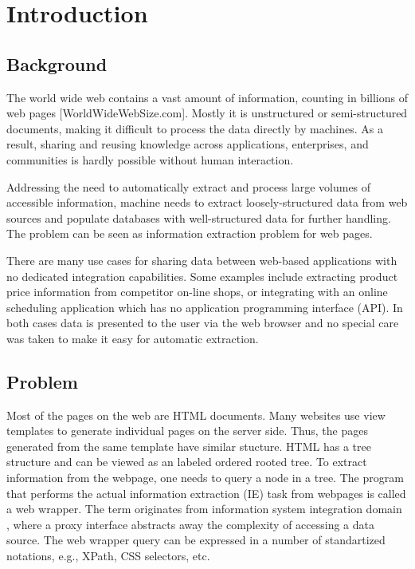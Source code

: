 \chapter{Introduction}


\section{Background} %
\label{sec:Problem}


The world wide web contains a vast amount of information, counting in billions of web pages [WorldWideWebSize.com]. Mostly it is unstructured or semi-structured documents, making it difficult to process the data directly by machines. As a result, sharing and reusing knowledge across applications, enterprises, and communities is hardly possible without human interaction.

Addressing the need to automatically extract and process large volumes of accessible information, machine needs to extract loosely-structured data from web sources and populate databases with well-structured data for further handling. The problem can be seen as information extraction problem for web pages. 

There are many use cases for sharing data between web-based applications with no dedicated integration capabilities. Some examples include extracting product price information from competitor on-line shops, or integrating with an online scheduling application which has no application programming interface (API). In both cases data is presented to the user via the web browser and no special care was taken to make it easy for automatic extraction.


\section{Problem}


Most of the pages on the web are HTML documents. Many websites use view templates to generate individual pages on the server side. Thus, the pages generated from the same template have similar stucture. HTML has a tree structure and can be viewed as an labeled ordered rooted tree. To extract information from the webpage, one needs to query a node in a tree. The program that performs the actual information extraction (IE) task from webpages is called a web wrapper. The term originates from information system integration domain \cite{Chang:2006:SWI:1159162.1159300}, where a proxy interface abstracts away the complexity of accessing a data source. The web wrapper query can be expressed in a number of standartized notations, e.g., XPath, CSS selectors, etc.


